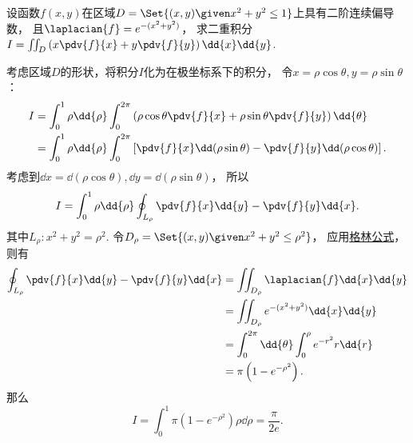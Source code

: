 \begin{example}
设函数\(f(x,y)\)在区域\(D=\Set{(x,y) \given x^2+y^2\leq1}\)上具有二阶连续偏导数，
且\(\laplacian{f}=e^{-(x^2+y^2)}\)，
求二重积分\(I=\iint_D\left(x\pdv{f}{x}+y\pdv{f}{y}\right)\dd{x}\dd{y}\).
\begin{solution}
考虑区域\(D\)的形状，将积分\(I\)化为在极坐标系下的积分，
令\(x=\rho\cos\theta, y=\rho\sin\theta\)：
\begin{align*}
	I &= \int_0^1 \rho\dd{\rho} \int_0^{2\pi}
		\left(\rho\cos\theta\pdv{f}{x}+\rho\sin\theta\pdv{f}{y}\right) \dd{\theta} \\
	&= \int_0^1 \rho\dd{\rho} \int_0^{2\pi}
		\left[\pdv{f}{x}\dd(\rho\sin\theta)-\pdv{f}{y}\dd(\rho\cos\theta)\right].
\end{align*}
考虑到\(\dd{x}=\dd(\rho\cos\theta),
\dd{y}=\dd(\rho\sin\theta)\)，
所以\[
	I = \int_0^1 \rho\dd{\rho} \oint_{L_\rho} \pdv{f}{x}\dd{y}-\pdv{f}{y}\dd{x}.
\]
其中\(L_\rho: x^2+y^2=\rho^2\).
令\(D_\rho = \Set{ (x,y) \given x^2+y^2\leq\rho^2 }\)，
应用\hyperref[equation:线积分与面积分.格林公式]{格林公式}，
则有\begin{align*}
	\oint_{L_\rho} \pdv{f}{x}\dd{y}-\pdv{f}{y}\dd{x}
	&= \iint_{D_\rho} \laplacian{f} \dd{x}\dd{y} \\
	&= \iint_{D_\rho} e^{-(x^2+y^2)} \dd{x}\dd{y} \\
	&= \int_0^{2\pi} \dd{\theta} \int_0^\rho e^{-r^2} r\dd{r} \\
	&= \pi \left(1-e^{-\rho^2}\right).
\end{align*}
那么\[
	I = \int_0^1 \pi \left(1-e^{-\rho^2}\right) \rho\dd{\rho}
	=  \frac{\pi}{2e}.
\]
\end{solution}
\end{example}


